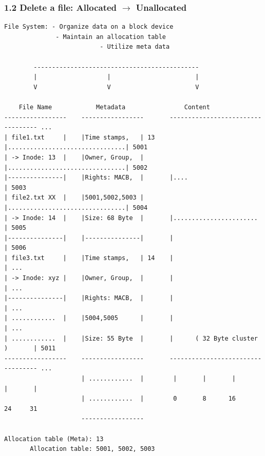 \begin{frame}[fragile]
  \frametitle{1.2 Delete a file: Allocated $\to$ Unallocated}
  \begin{lstlisting}[basicstyle=\tiny\ttfamily]
             File System: - Organize data on a block device
			  - Maintain an allocation table
                          - Utilize meta data
                            
        ---------------------------------------------
        |                   |                       |
        V                   V                       V

    File Name            Metadata                Content     
-----------------    -----------------       ---------------------------------- ...
| file1.txt     |    |Time stamps,   | 13    |................................| 5001
| -> Inode: 13  |    |Owner, Group,  |       |................................| 5002
|---------------|    |Rights: MACB,  |       |....                            | 5003
| file2.txt XX  |    |5001,5002,5003 |       |................................| 5004
| -> Inode: 14  |    |Size: 68 Byte  |       |.......................         | 5005
|---------------|    |---------------|       |                                | 5006
| file3.txt     |    |Time stamps,   | 14    |                                | ...
| -> Inode: xyz |    |Owner, Group,  |       |                                | ...
|---------------|    |Rights: MACB,  |       |                                | ...
| ............  |    |5004,5005      |       |                                | ...
| ............  |    |Size: 55 Byte  |       |      ( 32 Byte cluster )       | 5011
-----------------    -----------------       ---------------------------------- ...
                     | ............  |        |       |       |       |       |
                     | ............  |        0       8      16      24     31
                     -----------------    

Allocation table (Meta): 13
       Allocation table: 5001, 5002, 5003
  \end{lstlisting}
\end{frame}


